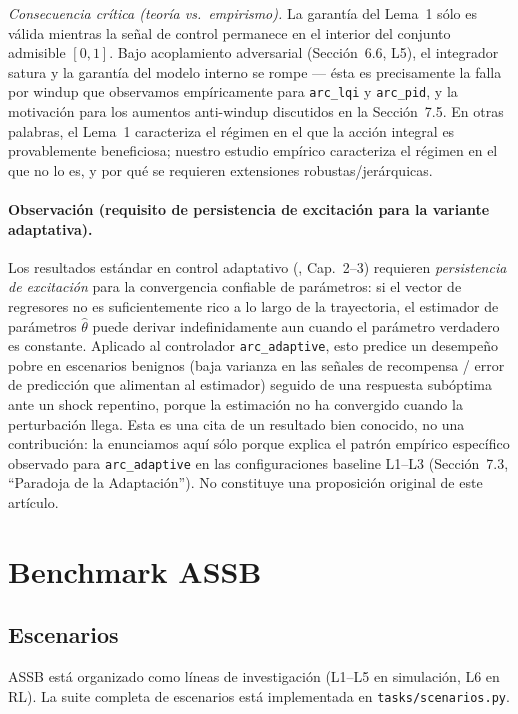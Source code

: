 \documentclass{article}
\begin{document}
\textit{Consecuencia crítica (teoría vs.\ empirismo).} La garantía del Lema~1 sólo es válida mientras la señal de control permanece en el interior del conjunto admisible $[0,1]$. Bajo acoplamiento adversarial (Sección~6.6, L5), el integrador satura y la garantía del modelo interno se rompe --- ésta es precisamente la falla por windup que observamos empíricamente para \texttt{arc\_lqi} y \texttt{arc\_pid}, y la motivación para los aumentos anti-windup discutidos en la Sección~7.5. En otras palabras, el Lema~1 caracteriza el régimen en el que la acción integral es provablemente beneficiosa; nuestro estudio empírico caracteriza el régimen en el que no lo es, y por qué se requieren extensiones robustas/jerárquicas.

\paragraph{Observación (requisito de persistencia de excitación para la variante adaptativa).}
Los resultados estándar en control adaptativo (\cite{Astrom2008}, Cap.~2--3) requieren \textit{persistencia de excitación} para la convergencia confiable de parámetros: si el vector de regresores no es suficientemente rico a lo largo de la trayectoria, el estimador de parámetros $\hat{\theta}$ puede derivar indefinidamente aun cuando el parámetro verdadero es constante. Aplicado al controlador \texttt{arc\_adaptive}, esto predice un desempeño pobre en escenarios benignos (baja varianza en las señales de recompensa / error de predicción que alimentan al estimador) seguido de una respuesta subóptima ante un shock repentino, porque la estimación no ha convergido cuando la perturbación llega. Esta es una cita de un resultado bien conocido, no una contribución: la enunciamos aquí sólo porque explica el patrón empírico específico observado para \texttt{arc\_adaptive} en las configuraciones baseline L1--L3 (Sección~7.3, ``Paradoja de la Adaptación''). No constituye una proposición original de este artículo.

\section{Benchmark ASSB}

\subsection{Escenarios}

ASSB está organizado como líneas de investigación (L1--L5 en simulación, L6 en RL). La suite completa de escenarios está implementada en \texttt{tasks/scenarios.py}.
\end{document}
